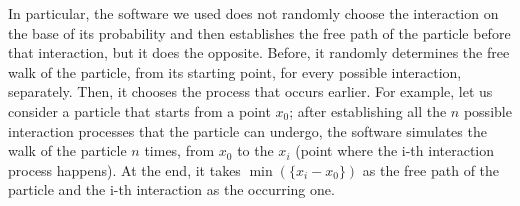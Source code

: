 \documentclass[12pt, a4paper, twoside]{book}
\begin{document}
In particular, the software we used does not randomly choose the interaction on the base of its probability and then establishes the free path of the particle before that interaction, but it does the opposite. Before, it randomly determines the free walk of the particle, from its starting point, for every possible interaction, separately. %
Then, it chooses the process that occurs earlier.
For example, let us consider a particle that starts from a point $x_0$; after establishing all the $n$ possible interaction processes that the particle can undergo, the software simulates the walk of the particle $n$ times, from $x_0$ to the $x_i$ (point where the i-th interaction process happens). At the end, it takes $\min(\{ x_i-x_0 \})$ as the free path of the particle and the i-th interaction as the occurring one.

\end{document}
